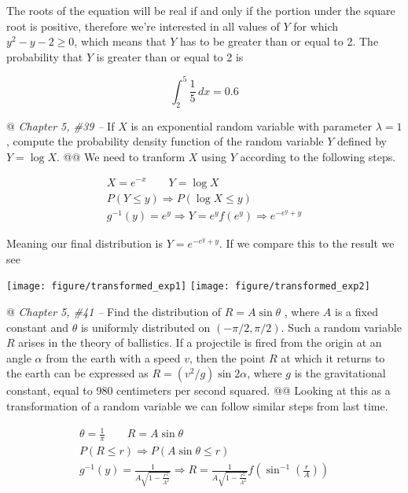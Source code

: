 \documentclass[10pt]{article}\usepackage[]{graphicx}\usepackage[]{xcolor}
\makeatletter
\def\maxwidth{ %
  \ifdim\Gin@nat@width>\linewidth
    \linewidth
  \else
    \Gin@nat@width
  \fi
}
\newenvironment{knitrout}{}{} %
\makeatother
\begin{document}
\begin{easylist}[enumerate]
    The roots of the equation will be real if and only if the portion under the square root is positive, therefore we're
    interested in all values of $Y$ for which $y^2 - y - 2 \ge 0$, which means that $Y$ has to be greater than or equal
    to 2. The probability that $Y$ is greater than or equal to 2 is

    \[
        \int_2^5 \frac{1}{5} \, dx = \boxed{0.6}
    \]

    @ \textit{Chapter 5, \#39 --} If $X$ is an exponential random variable with parameter $\lambda = 1$, compute the
    probability density function of the random variable $Y$ defined by $Y = \log X$.
    @@ We need to tranform $X$ using $Y$ according to the following steps.

    \[
        \begin{aligned}
            X = e^{-x} \qquad Y = \log X\\
            P(Y \le y) \Rightarrow P(\log X \le y)\\
            g^{-1}(y) = e^y \Rightarrow Y = e^y f(e^y) \Rightarrow e^{-e^y + y}
        \end{aligned}
    \]

    Meaning our final distribution is $\boxed{Y = e^{-e^y + y}}$. If we compare this to the result we see

\begin{knitrout}
\color{fgcolor}

{\centering \texttt{[image: figure/transformed\_exp1]} 
\texttt{[image: figure/transformed\_exp2]} 

}



\end{knitrout}


    @ \textit{Chapter 5, \#41 --} Find the distribution of $R = A \sin \theta$ , where $A$ is a fixed constant and
    $\theta$ is uniformly distributed on $(-\pi/2, \pi/2)$. Such a random variable $R$ arises in the theory of
    ballistics. If a projectile is fired from the origin at an angle $\alpha$ from the earth with a speed $v$, then the
    point $R$ at which it returns to the earth can be expressed as $R = (v^2/g) \sin 2 \alpha$, where $g$ is the
    gravitational constant, equal to 980 centimeters per second squared.
    @@ Looking at this as a transformation of a random variable we can follow similar steps from last time.

    \[
        \begin{aligned}
            \theta = \frac{1}{\pi} \qquad R = A \sin \theta\\
            P(R \le r) \Rightarrow P(A \sin \theta \le r)\\
            g^{-1}(y) = \frac{1}{A \sqrt{1-\frac{r^2}{A^2}}} \Rightarrow R =
                \frac{1}{A \sqrt{1-\frac{r^2}{A^2}}} f\left(\sin^{-1} \left( \frac{r}{A} \right)\right)\\
        \end{aligned}
    \]


\end{easylist}
\end{document}
